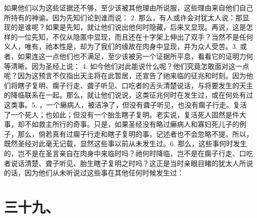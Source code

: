 如果他们以为这些证据还不够，至少该被其他理由所说服，这些理由来自他们自己所持有的神谕。因为先知们论到谁而说： 2. 那么，有人或许会对犹太人说：那显现的是谁呢？如果是先知，就让他们说出他何时隐藏，后来又显现。再说，这是怎样的一位先知，不仅从隐匿中显现，而且还在十字架上伸出了双手？当然不是任何义人，唯有，祂本性是，却为了我们的缘故在肉身中显现，并为众人受苦。3. 或者，如果连这一点他们也不满足，至少该被另一个证据所平息，看看它的证明力何等清晰。因为圣经上说： 4. 如今他们对此能说什么呢？他们究竟怎敢面对这一点呢？因为这预言不仅指出天主将在此暂居，还宣告了祂来临的征兆和时刻。因为他们将瞎子复明、瘸子行走、聋子听见、口吃者的舌头清楚说话，与将要发生的天主的降临联系在一起。那么，就让他们说说，这类征兆何时在发生过，或在何处有过这类事。5. ，一个癞病人，被洁净了，但没有聋子听见，也没有瘸子行走。复活了一个死人；也如此；但没有一个胎生瞎子复明。老实说，复活死人固然是件大事，却不如救主所行的奇事。只是，如果圣经没有略过癞病人和寡妇死儿子的例子，那么，倘若真有过瘸子行走和瞎子复明的事，记述者也不会忽略不提。所以，既然圣经对此毫无记载，显然这些事以前从未发生过。6. 那么，这些事何时发生的，岂不是在圣言亲自在肉身中来临时吗？祂何时降临，岂不是在瘸子行走、口吃者说话清楚、聋子听见、胎生瞎子复明之时吗？这正是当时亲眼目睹的犹太人所说的话，因为他们从未听说过这些事在其他任何时候发生过：\par


\section{三十九、}


